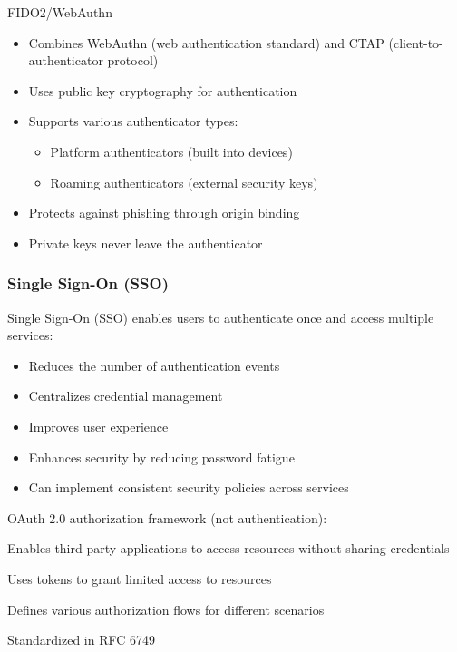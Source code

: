 \begin{concept}{FIDO2/WebAuthn}
\begin{itemize}
    \item Combines WebAuthn (web authentication standard) and CTAP (client-to-authenticator protocol)
    \item Uses public key cryptography for authentication
    \item Supports various authenticator types:
    \begin{itemize}
        \item Platform authenticators (built into devices)
        \item Roaming authenticators (external security keys)
    \end{itemize}
    \item Protects against phishing through origin binding
    \item Private keys never leave the authenticator
\end{itemize}
\end{concept}


\multend




\subsubsection{Single Sign-On (SSO)}



\begin{definition}{Single Sign-On (SSO)}
 enables users to authenticate once and access multiple services:
\begin{itemize}
    \item Reduces the number of authentication events
    \item Centralizes credential management
    \item Improves user experience
    \item Enhances security by reducing password fatigue
    \item Can implement consistent security policies across services
\end{itemize}
\end{definition}









\begin{definition}{OAuth 2.0}
     authorization framework (not authentication):

     Enables third-party applications to access resources without sharing credentials

      Uses tokens to grant limited access to resources

      Defines various authorization flows for different scenarios

      Standardized in RFC 6749

\end{definition}

